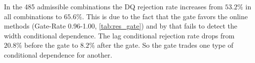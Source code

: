 %
In the 485 admissible combinations the DQ rejection rate increases from $53.2\%$ in all combinations to $65.6\%$. This is due to the fact that the gate favors the online methods (Gate-Rate 0.96-1.00, \cref{tab:res_gate}) and by that fails to detect the width conditional dependence. The lag conditional rejection rate drops from $20.8\%$ before the gate to $8.2\%$ after the gate. So the gate trades one type of conditional dependence for another. 
